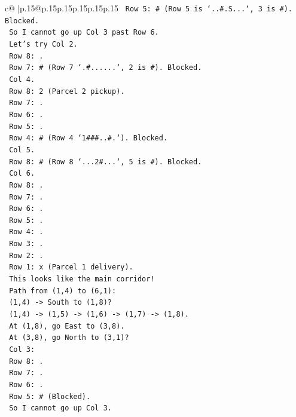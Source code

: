 \documentclass{article}
\begin{document}
{\begin{supertabular}{c@{$\;$}|p{.15\linewidth}@{}p{.15\linewidth}p{.15\linewidth}p{.15\linewidth}p{.15\linewidth}p{.15\linewidth}}
{{{\texttt{     Row 5: \# (Row 5 is `..\#.S...`, 3 is \#). Blocked.} \\
\texttt{     So I cannot go up Col 3 past Row 6.} \\
\texttt{     Let's try Col 2.} \\
\texttt{     Row 8: .} \\
\texttt{     Row 7: \# (Row 7 `.\#......`, 2 is \#). Blocked.} \\
\texttt{     Col 4.} \\
\texttt{     Row 8: 2 (Parcel 2 pickup).} \\
\texttt{     Row 7: .} \\
\texttt{     Row 6: .} \\
\texttt{     Row 5: .} \\
\texttt{     Row 4: \# (Row 4 `1\#\#\#..\#.`). Blocked.} \\
\texttt{     Col 5.} \\
\texttt{     Row 8: \# (Row 8 `...2\#...`, 5 is \#). Blocked.} \\
\texttt{     Col 6.} \\
\texttt{     Row 8: .} \\
\texttt{     Row 7: .} \\
\texttt{     Row 6: .} \\
\texttt{     Row 5: .} \\
\texttt{     Row 4: .} \\
\texttt{     Row 3: .} \\
\texttt{     Row 2: .} \\
\texttt{     Row 1: x (Parcel 1 delivery).} \\
\texttt{     This looks like the main corridor!} \\
\texttt{     Path from (1,4) to (6,1):} \\
\texttt{     (1,4) {-}> South to (1,8)?} \\
\texttt{     (1,4) {-}> (1,5) {-}> (1,6) {-}> (1,7) {-}> (1,8).} \\
\texttt{     At (1,8), go East to (3,8).} \\
\texttt{     At (3,8), go North to (3,1)?} \\
\texttt{     Col 3:} \\
\texttt{     Row 8: .} \\
\texttt{     Row 7: .} \\
\texttt{     Row 6: .} \\
\texttt{     Row 5: \# (Blocked).} \\
\texttt{     So I cannot go up Col 3.} \\
}}}
\end{supertabular}}
\end{document}

